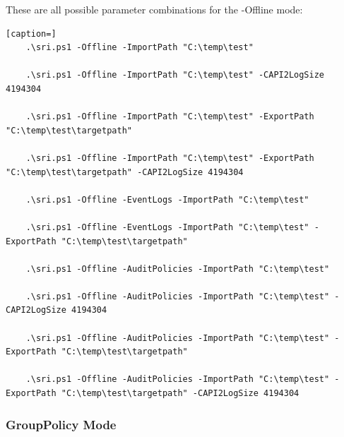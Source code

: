 \clearpage

These are all possible parameter combinations for the -Offline mode: \ \\
\begin{lstlisting}[caption=]
    .\sri.ps1 -Offline -ImportPath "C:\temp\test"

    .\sri.ps1 -Offline -ImportPath "C:\temp\test" -CAPI2LogSize 4194304
    
    .\sri.ps1 -Offline -ImportPath "C:\temp\test" -ExportPath "C:\temp\test\targetpath"
    
    .\sri.ps1 -Offline -ImportPath "C:\temp\test" -ExportPath "C:\temp\test\targetpath" -CAPI2LogSize 4194304
    
    .\sri.ps1 -Offline -EventLogs -ImportPath "C:\temp\test"
    
    .\sri.ps1 -Offline -EventLogs -ImportPath "C:\temp\test" -ExportPath "C:\temp\test\targetpath"
    
    .\sri.ps1 -Offline -AuditPolicies -ImportPath "C:\temp\test"
    
    .\sri.ps1 -Offline -AuditPolicies -ImportPath "C:\temp\test" -CAPI2LogSize 4194304
    
    .\sri.ps1 -Offline -AuditPolicies -ImportPath "C:\temp\test" -ExportPath "C:\temp\test\targetpath"
    
    .\sri.ps1 -Offline -AuditPolicies -ImportPath "C:\temp\test" -ExportPath "C:\temp\test\targetpath" -CAPI2LogSize 4194304
\end{lstlisting}

\clearpage

\subsubsection{GroupPolicy Mode}

